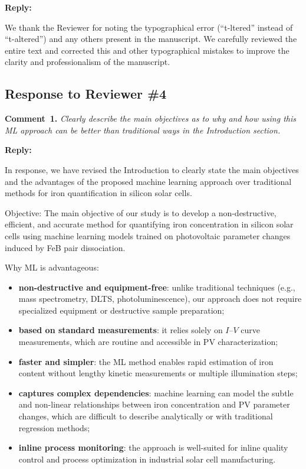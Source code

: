 \documentclass[a4paper,fleqn]{cas-sc}
\begin{document}
\noindent
\textcolor[rgb]{0.51,0.00,0.00}{\textbf{Reply:}}

We thank the Reviewer for noting the typographical error (“t-ltered” instead of “t-altered”) and any others present in the manuscript. 
We carefully reviewed the entire text and corrected this and other typographical mistakes to improve the clarity and professionalism of the manuscript.

\vspace{1cm}
\subsection*{Response to Reviewer \#4 }

\noindent
\textcolor[rgb]{0.00,0.50,1.00}{\textbf{Comment~1.}}
\emph{Clearly describe the main objectives as to why and how using this ML approach can be better than traditional ways in the Introduction section.}

\noindent
\textcolor[rgb]{0.51,0.00,0.00}{\textbf{Reply:}}


In response, we have revised the Introduction to clearly state the main objectives and the advantages of the proposed machine learning approach over traditional methods for iron quantification in silicon solar cells.


Objective:
The main objective of our study is to develop a non-destructive, efficient, and accurate method for quantifying iron concentration in silicon solar cells using machine learning models trained on photovoltaic parameter changes induced by FeB pair dissociation.


Why ML is advantageous:
\begin{itemize}
    \item \textbf{non-destructive and equipment-free}: unlike traditional techniques (e.g., mass spectrometry, DLTS, photoluminescence), our approach does not require specialized equipment or destructive sample preparation;
    \item \textbf{based on standard measurements}: it relies solely on $I$–$V$ curve measurements, which are routine and accessible in PV characterization;
    \item \textbf{faster and simpler}: the ML method enables rapid estimation of iron content without lengthy kinetic measurements or multiple illumination steps;
    \item \textbf{captures complex dependencies}: machine learning can model the subtle and non-linear relationships between iron concentration and PV parameter changes, which are difficult to describe analytically or with traditional regression methods;
    \item \textbf{inline process monitoring}: the approach is well-suited for inline quality control and process optimization in industrial solar cell manufacturing.
\end{itemize}
\end{document}
